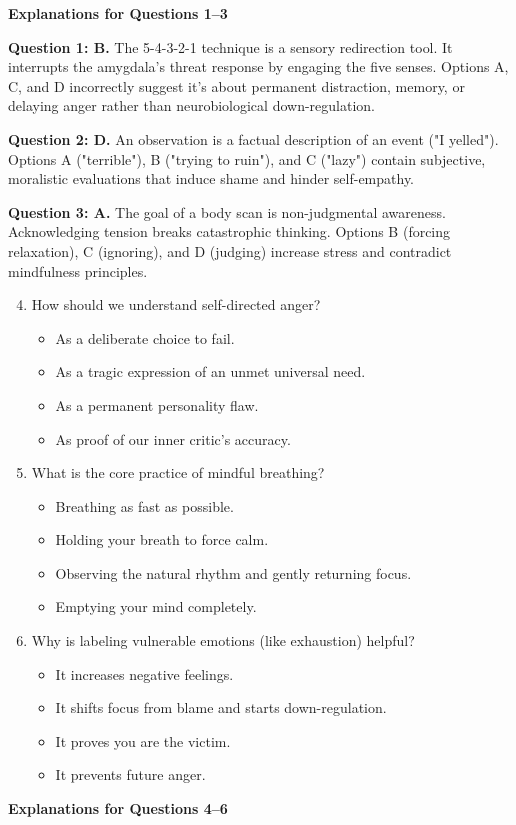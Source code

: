 \begin{practiceexercise}
\textbf{Explanations for Questions 1--3}

\textbf{Question 1: B.} The 5-4-3-2-1 technique is a sensory redirection tool. It interrupts the amygdala's threat response by engaging the five senses. Options A, C, and D incorrectly suggest it's about permanent distraction, memory, or delaying anger rather than neurobiological down-regulation.

\textbf{Question 2: D.} An observation is a factual description of an event ("I yelled"). Options A ("terrible"), B ("trying to ruin"), and C ("lazy") contain subjective, moralistic evaluations that induce shame and hinder self-empathy.

\textbf{Question 3: A.} The goal of a body scan is non-judgmental awareness. Acknowledging tension breaks catastrophic thinking. Options B (forcing relaxation), C (ignoring), and D (judging) increase stress and contradict mindfulness principles.
\vspace{\fill}
\newpage

\begin{enumerate}
    \setcounter{enumi}{3}
    \item How should we understand self-directed anger?
    \begin{itemize}
        \item[A)] As a deliberate choice to fail.
        \item[B)] As a tragic expression of an unmet universal need.
        \item[C)] As a permanent personality flaw.
        \item[D)] As proof of our inner critic's accuracy.
    \end{itemize}
  \item What is the core practice of mindful breathing?
    \begin{itemize}
        \item[A)] Breathing as fast as possible.
        \item[B)] Holding your breath to force calm.
        \item[C)] Observing the natural rhythm and gently returning focus.
        \item[D)] Emptying your mind completely.
    \end{itemize}
  \item Why is labeling vulnerable emotions (like exhaustion) helpful?
    \begin{itemize}
        \item[A)] It increases negative feelings.
        \item[B)] It shifts focus from blame and starts down-regulation.
        \item[C)] It proves you are the victim.
        \item[D)] It prevents future anger.
    \end{itemize}
\end{enumerate}
\vspace{\baselineskip}
\newpage
\textbf{Explanations for Questions 4--6}


\end{practiceexercise}
